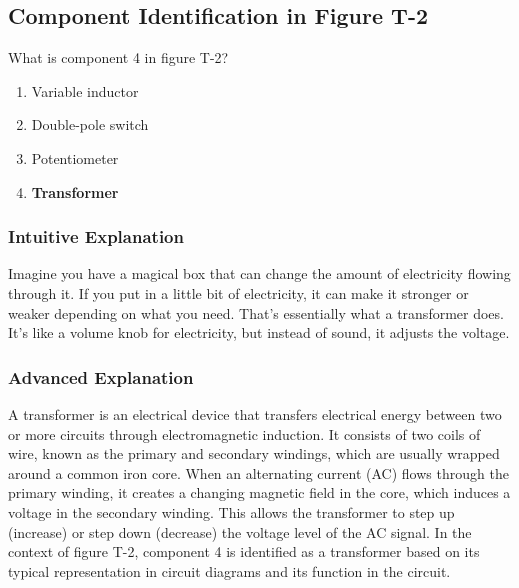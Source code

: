 \subsection{Component Identification in Figure T-2}
\label{T6C09}

\begin{tcolorbox}[colback=gray!10!white,colframe=black!75!black,title=T6C09]
What is component 4 in figure T-2?
\begin{enumerate}[noitemsep]
    \item Variable inductor
    \item Double-pole switch
    \item Potentiometer
    \item \textbf{Transformer}
\end{enumerate}
\end{tcolorbox}

\subsubsection*{Intuitive Explanation}
Imagine you have a magical box that can change the amount of electricity flowing through it. If you put in a little bit of electricity, it can make it stronger or weaker depending on what you need. That's essentially what a transformer does. It's like a volume knob for electricity, but instead of sound, it adjusts the voltage.

\subsubsection*{Advanced Explanation}
A transformer is an electrical device that transfers electrical energy between two or more circuits through electromagnetic induction. It consists of two coils of wire, known as the primary and secondary windings, which are usually wrapped around a common iron core. When an alternating current (AC) flows through the primary winding, it creates a changing magnetic field in the core, which induces a voltage in the secondary winding. This allows the transformer to step up (increase) or step down (decrease) the voltage level of the AC signal. In the context of figure T-2, component 4 is identified as a transformer based on its typical representation in circuit diagrams and its function in the circuit.

